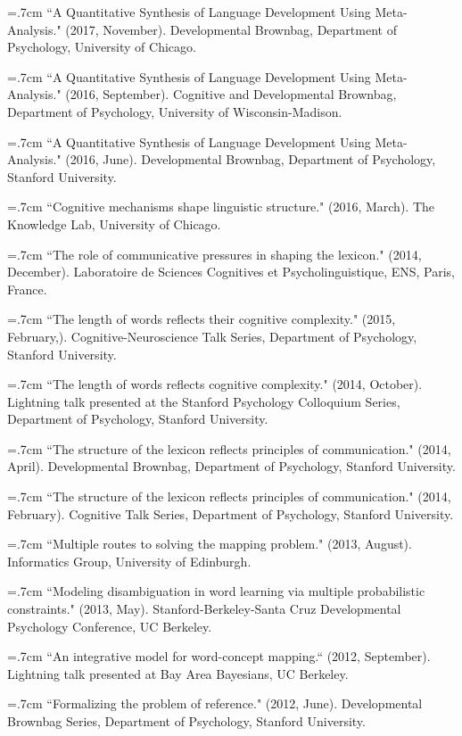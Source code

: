 \documentclass[letterpaper]{article}
\begin{document}
\hangindent=.7cm ``A Quantitative Synthesis of Language Development Using Meta-Analysis." (2017, November). Developmental Brownbag, Department of Psychology,  University of Chicago.

\hangindent=.7cm ``A Quantitative Synthesis of Language Development Using Meta-Analysis." (2016, September). Cognitive and Developmental Brownbag, Department of Psychology,  University of Wisconsin-Madison.

\hangindent=.7cm ``A Quantitative Synthesis of Language Development Using Meta-Analysis." (2016, June). Developmental Brownbag, Department of Psychology,  Stanford University.

\hangindent=.7cm  ``Cognitive mechanisms shape linguistic structure."  (2016, March). The Knowledge Lab, University of Chicago.

\hangindent=.7cm ``The role of communicative pressures in shaping the lexicon." (2014, December). Laboratoire de Sciences Cognitives et Psycholinguistique, ENS, Paris, France.

\hangindent=.7cm ``The length of words reflects their cognitive complexity." (2015, February,). Cognitive-Neuroscience Talk Series, Department of Psychology, Stanford University.

\hangindent=.7cm ``The length of words reflects cognitive complexity." (2014, October). Lightning talk presented at the Stanford Psychology Colloquium Series, Department of Psychology, Stanford University.


\hangindent=.7cm ``The structure of the lexicon reflects principles of communication." (2014, April). Developmental Brownbag, Department of Psychology, Stanford University.

\hangindent=.7cm ``The structure of the lexicon reflects principles of communication." (2014, February). Cognitive Talk Series, Department of Psychology, Stanford University.

\hangindent=.7cm ``Multiple routes to solving the mapping problem." (2013, August). Informatics Group, University of Edinburgh.
 
\hangindent=.7cm ``Modeling disambiguation in word learning via multiple probabilistic constraints." (2013, May). Stanford-Berkeley-Santa Cruz Developmental Psychology Conference, UC Berkeley.

 \hangindent=.7cm ``An integrative model for word-concept mapping.`` (2012, September). Lightning talk presented at Bay Area Bayesians, UC Berkeley.

\hangindent=.7cm ``Formalizing the problem of reference."  (2012, June). Developmental Brownbag Series, Department of Psychology, Stanford University.
\end{document}
